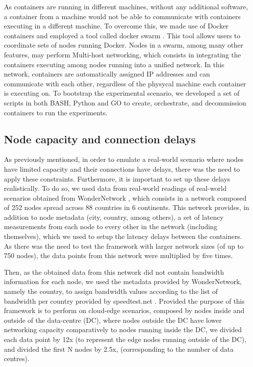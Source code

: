 As containers are running in different machines, without any additional software, a container from a machine would not be able to communicate with containers executing in a different machine. To overcome this, we made use of Docker \cite{docker} containers and employed a tool called docker swarm \cite{docker-swarm}. This tool allows users to coordinate sets of nodes running Docker. Nodes in a swarm, among many other features, may perform Multi-host networking, which consists in integrating the containers executing among nodes running into a unified network. In this network, containers are automatically assigned IP addresses and can communicate with each other, regardless of the physycal machine each container is executing on. To bootstrap the experimental scenario, we developed a set of scripts in both BASH, Python and GO to create, orchestrate, and decommission containers to run the experiments.

\subsection{Node capacity and connection delays}

As previously mentioned, in order to emulate a real-world scenario where nodes have limited capacity and their connections have delays, there was the need to apply these constraints. Furthermore, it is important to set up these delays realistically. To do so, we used data from real-world readings of real-world scenarios obtained from WonderNetwork \cite{wondernetwork}, which consists in a network composed of 252 nodes spread across 88 countries in 6 continents. This network provides, in addition to node metadata (city, country, among others), a set of latency measurements from each node to every other in the network (including themselves), which we used to setup the latency delays between the containers. As there was the need to test the framework with larger network sizes (of up to 750 nodes), the data points from this network were multiplied by five times. 

Then, as the obtained data from this network did not contain bandwidth information for each node, we used the metadata provided by WonderNetwork, namely the country, to assign bandwidth values according to the list of bandwidth per country provided by speedtest.net \cite{speedtest_global_index}. Provided the purpose of this framework is to perform on cloud-edge scenarios, composed by nodes inside and outside of the data-centre (DC), where nodes outside the DC have lower networking capacity comparatively to nodes running inside the DC, we divided each data point by 12x (to represent the edge nodes running outside of the DC), and divided the first N nodes by 2.5x, (corresponding to the number of data centres).

